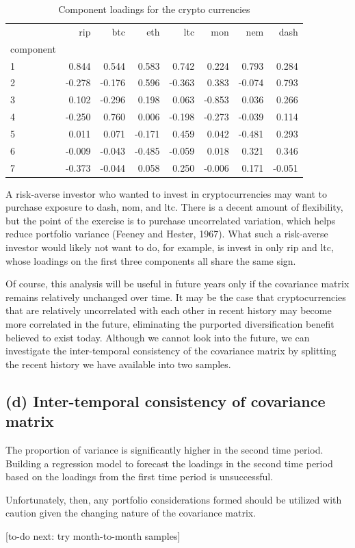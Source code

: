 \documentclass[12pt,twoside]{article}
\begin{document}
\begin{table}[H]
\begin{tabular}{lrrrrrrr}
	\toprule
	{} &    rip &    btc &    eth &    ltc &    mon &    nem &   dash \\
	component &        &        &        &        &        &        &        \\
	\midrule
	1         &  0.844 &  0.544 &  0.583 &  0.742 &  0.224 &  0.793 &  0.284 \\
	2         & -0.278 & -0.176 &  0.596 & -0.363 &  0.383 & -0.074 &  0.793 \\
	3         &  0.102 & -0.296 &  0.198 &  0.063 & -0.853 &  0.036 &  0.266 \\
	4         & -0.250 &  0.760 &  0.006 & -0.198 & -0.273 & -0.039 &  0.114 \\
	5         &  0.011 &  0.071 & -0.171 &  0.459 &  0.042 & -0.481 &  0.293 \\
	6         & -0.009 & -0.043 & -0.485 & -0.059 &  0.018 &  0.321 &  0.346 \\
	7         & -0.373 & -0.044 &  0.058 &  0.250 & -0.006 &  0.171 & -0.051 \\
	\bottomrule
\end{tabular}
\caption{Component loadings for the crypto currencies}
\end{table}

A risk-averse investor who wanted to invest in cryptocurrencies may want to purchase exposure to dash, nom, and ltc. There is a decent amount of flexibility, but the point of the exercise is to purchase uncorrelated variation, which helps reduce portfolio variance (Feeney and Hester, 1967). What such a risk-averse investor would likely not want to do, for example, is invest in only rip and ltc, whose loadings on the first three components all share the same sign.

\bigbreak

Of course, this analysis will be useful in future years only if the covariance matrix remains relatively unchanged over time. It may be the case that cryptocurrencies that are relatively uncorrelated with each other in recent history may become more correlated in the future, eliminating the purported diversification benefit believed to exist today. Although we cannot look into the future, we can investigate the inter-temporal consistency of the covariance matrix by splitting the recent history we have available into two samples.

\subsection{(d) Inter-temporal consistency of covariance matrix}

The proportion of variance is significantly higher in the second time period. Building a regression model to forecast the loadings in the second time period based on the loadings from the first time period is unsuccessful.

Unfortunately, then, any portfolio considerations formed should be utilized with caution given the changing nature of the covariance matrix.

[to-do next: try month-to-month samples]
\end{document}
